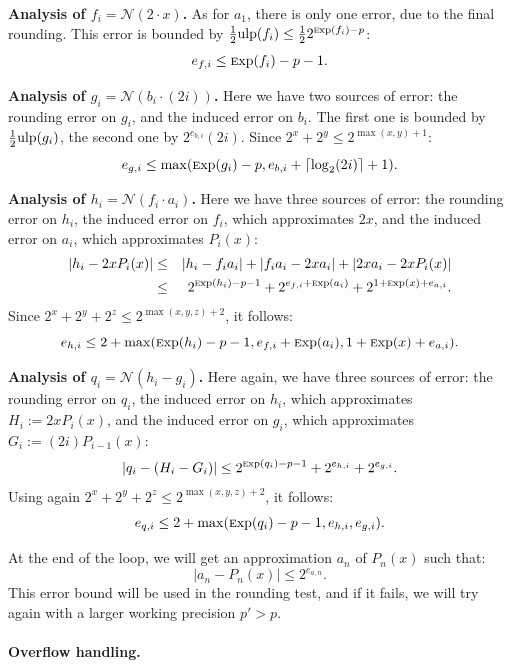 \documentclass[12pt]{amsart}
\def\ulp{{\rm ulp}}
\def\Exp{{\rm \textsc exp}}
\def\N{{\mathcal N}}
\begin{document}
\par\noindent
\textbf{Analysis of $f_i = \N{}(2\cdot{}x)$.} As for $a_1$, there is only
one error, due to the final rounding. This error is bounded by
$\frac{1}{2} \ulp(f_i) \le \frac{1}{2} 2^{\Exp(f_i) - p}$:
\[ e_{f,i} \le \Exp(f_i) - p - 1. \]

\par\noindent
\textbf{Analysis of $g_i = \N{}(b_i \cdot{}(2i))$.}
Here we have two sources of error: the rounding error on $g_i$, and
the induced error on $b_i$. The first one is bounded by
$\frac{1}{2} \ulp(g_i)$, the second one by $2^{e_{b,i}} (2i)$.
Since $2^x+2^y \le 2^{\max(x,y)+1}$:
\[ e_{g,i} \le \max(\Exp(g_i)-p, e_{b,i} + \lceil \log_2(2i) \rceil + 1). \]

\par\noindent
\textbf{Analysis of $h_i = \N{}(f_i\cdot{}a_i)$.}
Here we have three sources of error: the rounding error on $h_i$,
the induced error on $f_i$, which approximates $2x$,
and the induced error on $a_i$, which approximates $P_i(x)$:
\begin{eqnarray*}
  |h_i - 2x P_i(x)| & \le &
  |h_i - f_i a_i| + |f_i a_i - 2x a_i| + |2x a_i - 2x P_i(x)| \\
  & \le & 2^{\Exp(h_i)-p-1} + 2^{e_{f,i} + \Exp(a_i)} + 2^{1 + \Exp(x) + e_{a,i}}.
\end{eqnarray*}
Since $2^x + 2^y + 2^z \le 2^{\max(x,y,z)+2}$, it follows:
\[ e_{h,i} \le 2 + \max(\Exp(h_i)-p-1, e_{f,i} + \Exp(a_i),
  1 + \Exp(x) + e_{a,i}). \]

\par\noindent
\textbf{Analysis of $q_i = \N{}(h_i - g_i)$.}
Here again, we have three sources of error: the rounding error on $q_i$,
the induced error on $h_i$, which approximates $H_i := 2x P_i(x)$,
and the induced error on $g_i$, which approximates $G_i := (2i)P_{i-1}(x)$:
\[ |q_i - (H_i - G_i)| \le 2^{\Exp(q_i)-p-1} + 2^{e_{h,i}} + 2^{e_{g,i}}. \]
Using again $2^x + 2^y + 2^z \le 2^{\max(x,y,z)+2}$, it follows:
\[ e_{q,i} \le 2 + \max(\Exp(q_i)-p-1, e_{h,i}, e_{g,i}). \]

At the end of the loop, we will get an approximation $a_n$ of $P_n(x)$ such
that:
\[ |a_n - P_n(x)| \le 2^{e_{a,n}}. \]
This error bound will be used in the rounding test, and if it fails, we will try
again with a larger working precision $p' > p$.

\paragraph{\textbf{Overflow handling.}}
\end{document}
